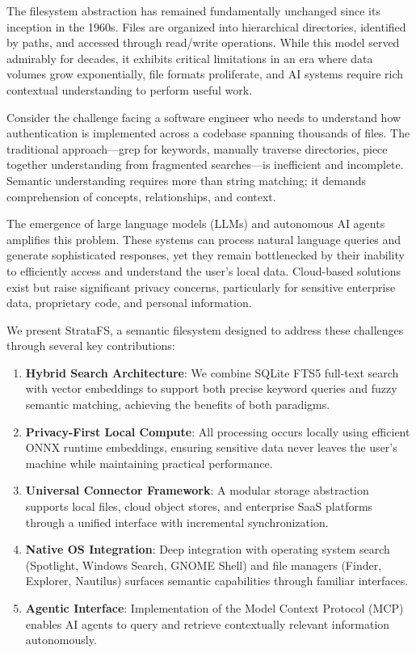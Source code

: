 \documentclass[conference]{IEEEtran}
\begin{document}
The filesystem abstraction has remained fundamentally unchanged since its inception in the 1960s. Files are organized into hierarchical directories, identified by paths, and accessed through read/write operations. While this model served admirably for decades, it exhibits critical limitations in an era where data volumes grow exponentially, file formats proliferate, and AI systems require rich contextual understanding to perform useful work.

Consider the challenge facing a software engineer who needs to understand how authentication is implemented across a codebase spanning thousands of files. The traditional approach---grep for keywords, manually traverse directories, piece together understanding from fragmented searches---is inefficient and incomplete. Semantic understanding requires more than string matching; it demands comprehension of concepts, relationships, and context.

The emergence of large language models (LLMs) and autonomous AI agents amplifies this problem. These systems can process natural language queries and generate sophisticated responses, yet they remain bottlenecked by their inability to efficiently access and understand the user's local data. Cloud-based solutions exist but raise significant privacy concerns, particularly for sensitive enterprise data, proprietary code, and personal information.

We present StrataFS, a semantic filesystem designed to address these challenges through several key contributions:

\begin{enumerate}
    \item \textbf{Hybrid Search Architecture}: We combine SQLite FTS5 full-text search with vector embeddings to support both precise keyword queries and fuzzy semantic matching, achieving the benefits of both paradigms.

    \item \textbf{Privacy-First Local Compute}: All processing occurs locally using efficient ONNX runtime embeddings, ensuring sensitive data never leaves the user's machine while maintaining practical performance.

    \item \textbf{Universal Connector Framework}: A modular storage abstraction supports local files, cloud object stores, and enterprise SaaS platforms through a unified interface with incremental synchronization.

    \item \textbf{Native OS Integration}: Deep integration with operating system search (Spotlight, Windows Search, GNOME Shell) and file managers (Finder, Explorer, Nautilus) surfaces semantic capabilities through familiar interfaces.

    \item \textbf{Agentic Interface}: Implementation of the Model Context Protocol (MCP) enables AI agents to query and retrieve contextually relevant information autonomously.
\end{enumerate}
\end{document}
